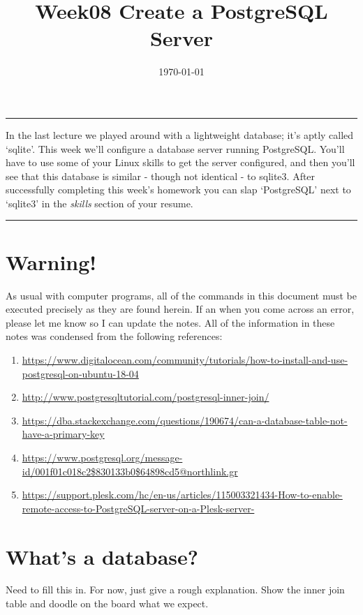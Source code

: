 \documentclass[12pt,a4paper]{article}
\renewenvironment{abstract}{%
\hfill\begin{minipage}{0.95\textwidth}
\rule{\textwidth}{1pt}}
{\par\noindent\rule{\textwidth}{1pt}\end{minipage}}
\begin{document}
%
\title{\textbf{Week08 Create a PostgreSQL Server}}
\date{\today}
%
\maketitle

\begin{abstract}
In the last lecture we played around with a lightweight database; it's aptly
called `sqlite'. This week we'll configure a database server running PostgreSQL.
You'll have to use some of your Linux skills to get the server configured, and
then you'll see that this database is similar - though not identical - to
sqlite3. After successfully completing this week's homework you can slap
`PostgreSQL' next to `sqlite3' in the \textit{skills} section of your resume.
\end{abstract}

\section{Warning!}
As usual with computer programs, all of the commands in this document must be executed precisely as they are found herein. If an when you come across an error, please let me know so I can update the notes. All of the information in these notes was condensed from the following references:

\begin{enumerate}
\item \url{https://www.digitalocean.com/community/tutorials/how-to-install-and-use-postgresql-on-ubuntu-18-04}
\item \url{http://www.postgresqltutorial.com/postgresql-inner-join/}
\item \url{https://dba.stackexchange.com/questions/190674/can-a-database-table-not-have-a-primary-key}
\item \url{https://www.postgresql.org/message-id/001f01c018c2$830133b0$64898cd5@northlink.gr}
\item \url{https://support.plesk.com/hc/en-us/articles/115003321434-How-to-enable-remote-access-to-PostgreSQL-server-on-a-Plesk-server-}
\end{enumerate}

\section{What's a database?}
Need to fill this in. For now, just give a rough explanation.
Show the inner join table and doodle on the board what we expect.
\end{document}
